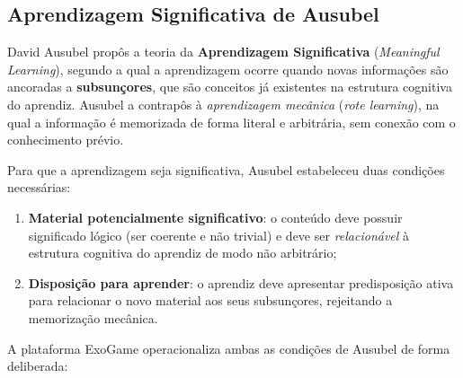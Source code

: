 \documentclass[
	12pt,
	openany,
	oneside,
	a4paper,
	english,
	brazil
]{abntex2}
\begin{document}
\subsection{Aprendizagem Significativa de Ausubel}
 
David Ausubel \cite{ausubel1968, ausubel2000} propôs a teoria da \textbf{Aprendizagem Significativa} (\textit{Meaningful Learning}), segundo a qual a aprendizagem ocorre quando novas informações são ancoradas a \textbf{subsunçores}, que são conceitos já existentes na estrutura cognitiva do aprendiz. Ausubel a contrapôs à \textit{aprendizagem mecânica} (\textit{rote learning}), na qual a informação é memorizada de forma literal e arbitrária, sem conexão com o conhecimento prévio.
 
Para que a aprendizagem seja significativa, Ausubel estabeleceu duas condições necessárias:
 
\begin{enumerate}
  \item \textbf{Material potencialmente significativo}: o conteúdo deve possuir significado lógico (ser coerente e não trivial) e deve ser \textit{relacionável} à estrutura cognitiva do aprendiz de modo não arbitrário;
  \item \textbf{Disposição para aprender}: o aprendiz deve apresentar predisposição ativa para relacionar o novo material aos seus subsunçores, rejeitando a memorização mecânica.
\end{enumerate}
 
A plataforma ExoGame operacionaliza ambas as condições de Ausubel de forma deliberada:
 
\end{document}
